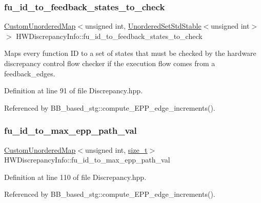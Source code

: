 \subsubsection{\texorpdfstring{fu\+\_\+id\+\_\+to\+\_\+feedback\+\_\+states\+\_\+to\+\_\+check}{fu\_id\_to\_feedback\_states\_to\_check}}
{\footnotesize\ttfamily \hyperlink{custom__map_8hpp_ad1ed68f2ff093683ab1a33522b144adc}{Custom\+Unordered\+Map}$<$unsigned int, \hyperlink{custom__set_8hpp_a1f63d303cef2790dc0a0ff7feae38f83}{Unordered\+Set\+Std\+Stable}$<$unsigned int$>$ $>$ H\+W\+Discrepancy\+Info\+::fu\+\_\+id\+\_\+to\+\_\+feedback\+\_\+states\+\_\+to\+\_\+check}



Maps every function ID to a set of states that must be checked by the hardware discrepancy control flow checker if the execution flow comes from a feedback\+\_\+edges. 



Definition at line 91 of file Discrepancy.\+hpp.



Referenced by B\+B\+\_\+based\+\_\+stg\+::compute\+\_\+\+E\+P\+P\+\_\+edge\+\_\+increments().

\mbox{\label{structHWDiscrepancyInfo_a8d563f0d9fde448ec9281c775d734f20}} 
\subsubsection{\texorpdfstring{fu\+\_\+id\+\_\+to\+\_\+max\+\_\+epp\+\_\+path\+\_\+val}{fu\_id\_to\_max\_epp\_path\_val}}
{\footnotesize\ttfamily \hyperlink{custom__map_8hpp_ad1ed68f2ff093683ab1a33522b144adc}{Custom\+Unordered\+Map}$<$unsigned int, \hyperlink{tutorial__fpt__2017_2intro_2sixth_2test_8c_a7c94ea6f8948649f8d181ae55911eeaf}{size\+\_\+t}$>$ H\+W\+Discrepancy\+Info\+::fu\+\_\+id\+\_\+to\+\_\+max\+\_\+epp\+\_\+path\+\_\+val}



Definition at line 110 of file Discrepancy.\+hpp.



Referenced by B\+B\+\_\+based\+\_\+stg\+::compute\+\_\+\+E\+P\+P\+\_\+edge\+\_\+increments().


